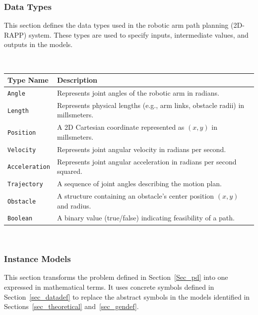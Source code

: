 \documentclass[12pt]{article}
\newcommand{\colAwidth}{0.13\textwidth}
\newcommand{\colBwidth}{0.82\textwidth}
\begin{document}
\subsubsection{Data Types}\label{sec_datatypes}

This section defines the data types used in the robotic arm path planning (2D-RAPP) system. These types are used to specify inputs, intermediate values, and outputs in the models.

~\newline

\noindent
\begin{minipage}{\textwidth}
\renewcommand*{\arraystretch}{1.5}
\begin{tabular}{| p{\colAwidth} | p{\colBwidth}|}
  \hline
  \rowcolor[gray]{0.9}
  Type Name & Description\\
  \hline
  \texttt{Angle} & Represents joint angles of the robotic arm in radians. \\
  \hline
  \texttt{Length} & Represents physical lengths (e.g., arm links, obstacle radii) in millsmeters. \\
  \hline
  \texttt{Position} & A 2D Cartesian coordinate represented as $(x, y)$ in millsmeters. \\
  \hline
  \texttt{Velocity} & Represents joint angular velocity in radians per second. \\
  \hline
  \texttt{Acceleration} & Represents joint angular acceleration in radians per second squared. \\
  \hline
  \texttt{Trajectory} & A sequence of joint angles describing the motion plan. \\
  \hline
  \texttt{Obstacle} & A structure containing an obstacle's center position $(x, y)$ and radius. \\
  \hline
  \texttt{Boolean} & A binary value (true/false) indicating feasibility of a path. \\
  \hline
\end{tabular}
\end{minipage}\\


\subsubsection{Instance Models} \label{sec_instance}

This section transforms the problem defined in Section~\ref{Sec_pd} into one expressed in mathematical terms. It uses concrete symbols defined in Section~\ref{sec_datadef} to replace the abstract symbols in the models identified in Sections~\ref{sec_theoretical} and~\ref{sec_gendef}.
\end{document}

